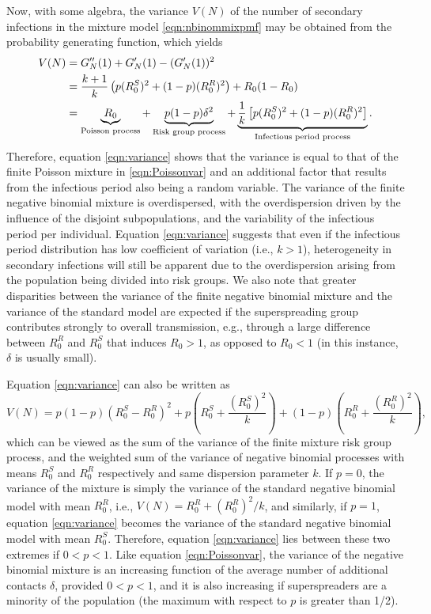 \documentclass{imammb}
\numberwithin{equation}{section}
\begin{document}
Now, with some algebra, the variance $V(N)$ of the number of secondary infections in the mixture model \eqref{eqn:nbinommixpmf} may be obtained from the probability generating function, which yields
\begin{align}\label{eqn:variance}
V(N) &= G_N''(1) + G_N'(1) -  (G_N'(1))^2 \notag \\ &= \frac{k+1}{k} \left (p (R_0^S)^2 + (1-p) (R_0^R)^2  \right ) +R_0(1-R_0) \notag\\ &=  \underbrace{R_0}_{\text{Poisson process}}+ \underbrace{p(1-p)\delta^2}_{\text{Risk group process}} +\underbrace{\frac{1}{k} \left[ p (R_0^S)^2 + (1-p)(R_0^R)^2 \right]}_{\text{Infectious period process}}. 
\end{align}
Therefore, equation \eqref{eqn:variance} shows that the variance is equal to that of the finite Poisson mixture in \eqref{eqn:Poissonvar} and an additional factor that results from the infectious period also being a random variable. The variance of the finite negative binomial mixture is overdispersed, with the overdispersion driven by the influence of the  disjoint subpopulations, and the variability of the infectious period per individual.  Equation \eqref{eqn:variance} suggests that even if the infectious period distribution has low coefficient of variation (i.e., $k>1$), heterogeneity in secondary infections will still be apparent due to the overdispersion arising from the population being divided into risk groups. We also note that greater disparities between the variance of the finite negative binomial mixture and the variance of the standard model are expected if the superspreading group contributes strongly to overall transmission, e.g., through a large difference between $R_0^R$ and $R_0^S$  that induces $R_0>1$, as opposed to $R_0<1$ (in this instance, $\delta$ is usually small). 

Equation \eqref{eqn:variance} can also be written as
\begin{equation*}
    V(N) = p(1-p)(R_0^S - R_0^R)^2 + p \left (R_0^S + \frac{(R_0^S)^2}{k} \right ) + (1-p) \left (R_0^R + \frac{(R_0^R)^2}{k} \right ),
\end{equation*}
which can be viewed as the sum of the variance of the finite mixture risk group process, and the weighted sum of the variance of negative binomial processes with means $R_0^S$ and $R_0^R$ respectively and same dispersion parameter $k$. If $p=0$, the variance of the mixture is simply the variance of the standard negative binomial model with mean $R_0^R$, i.e., $V(N) = R_0^R + (R_0^R)^2/k$, and similarly, if $p=1$, equation \eqref{eqn:variance} becomes the variance of the standard negative binomial model with mean $R_0^S$. Therefore, equation \eqref{eqn:variance} lies between these two extremes if $0<p<1$. Like equation \eqref{eqn:Poissonvar}, the variance of the negative binomial mixture is an increasing function of the average number of additional contacts $\delta$, provided $0<p<1$, and it is also increasing if superspreaders are a minority of the population (the maximum with respect to $p$ is greater than 1/2). 
\end{document}
